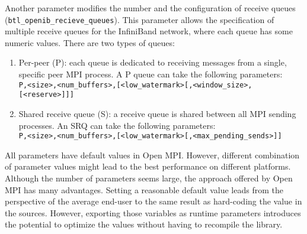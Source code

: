 Another parameter  modifies the number and the configuration of receive
queues ({\tt btl\_openib\_recieve\_queues}). This parameter allows the
specification of multiple receive queues for the InfiniBand network, where
each queue has some numeric values. There are two types of queues:
\begin{enumerate}
\item Per-peer (P): each queue is dedicated to receiving messages from a
  single, specific peer MPI process. A P queue can take the following
  parameters:\\
  {\tt P,<size>,<num\_buffers>,[<low\_watermark>[,<window\_size>,} \\
  {\tt [<reserve>]]]}
\item Shared receive queue (S): a receive queue is shared between all MPI
  sending processes. An SRQ can take the following parameters: \\
  {\tt P,<size>,<num\_buffers>,[<low\_watermark>[,<max\_pending\_sends>]]}
\end{enumerate}

All parameters have default values in Open MPI. However, different combination of parameter values might lead to the best performance  on different platforms. Although the number of parameters seems large, the approach offered by Open MPI has many advantages. Setting a reasonable default value leads from the perspective of the average end-user to the same 
result as hard-coding the value in the sources. However, exporting those variables as runtime parameters introduces the potential to optimize the values without having to recompile the library.
